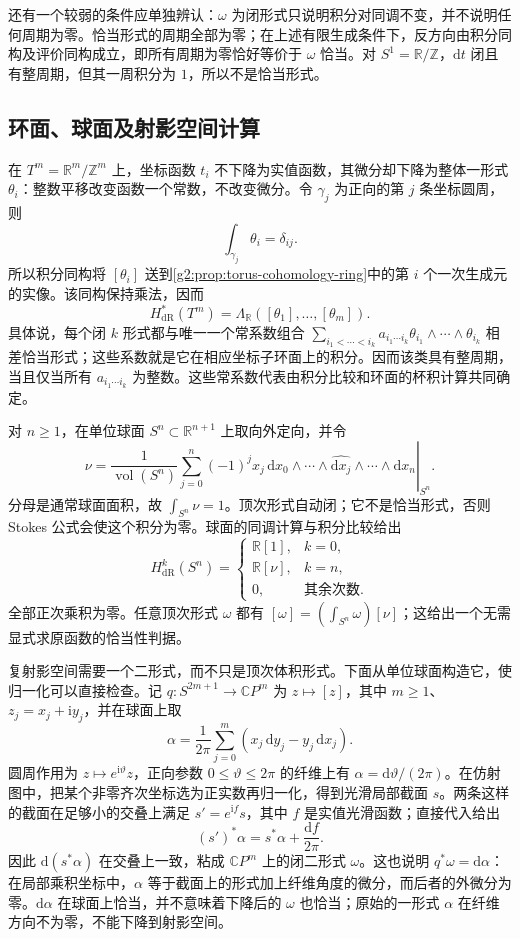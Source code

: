 还有一个较弱的条件应单独辨认：\(\omega\) 为闭形式只说明积分对同调不变，并不说明任何周期为零。恰当形式的周期全部为零；在上述有限生成条件下，反方向由积分同构及评价同构成立，即所有周期为零恰好等价于 \(\omega\) 恰当。对 \(S^1=\mathbb R/\mathbb Z\)，\(\mathrm dt\) 闭且有整周期，但其一周积分为 \(1\)，所以不是恰当形式。

\subsection{环面、球面及射影空间计算}
\label{g2:subsec:0704:02}
在 \(T^m=\mathbb R^m/\mathbb Z^m\) 上，坐标函数 \(t_i\) 不下降为实值函数，其微分却下降为整体一形式 \(\theta_i\)：整数平移改变函数一个常数，不改变微分。令 \(\gamma_j\) 为正向的第 \(j\) 条坐标圆周，则
\[
	\int_{\gamma_j}\theta_i=\delta_{ij}.
\]
所以积分同构将 \([\theta_i]\) 送到\cref{g2:prop:torus-cohomology-ring}中的第 \(i\) 个一次生成元的实像。该同构保持乘法，因而
\begin{equation}\label{g2:eq:torus-de-rham-ring}
	H^*_{\mathrm{dR}}(T^m)
	=\Lambda_{\mathbb R}([\theta_1],\ldots,[\theta_m]).
\end{equation}
具体说，每个闭 \(k\) 形式都与唯一一个常系数组合 \(\sum_{i_1<\cdots<i_k}a_{i_1\cdots i_k}\theta_{i_1}\wedge\cdots\wedge\theta_{i_k}\) 相差恰当形式；这些系数就是它在相应坐标子环面上的积分。因而该类具有整周期，当且仅当所有 \(a_{i_1\cdots i_k}\) 为整数。这些常系数代表由积分比较和环面的杯积计算共同确定。

对 \(n\geq1\)，在单位球面 \(S^n\subset\mathbb R^{n+1}\) 上取向外定向，并令
\[
	\nu=\frac{1}{\operatorname{vol}(S^n)}
	\left.\sum_{j=0}^n(-1)^j x_j\,\mathrm dx_0\wedge\cdots\wedge\widehat{\mathrm dx_j}\wedge\cdots\wedge\mathrm dx_n\right|_{S^n}.
\]
分母是通常球面面积，故 \(\int_{S^n}\nu=1\)。顶次形式自动闭；它不是恰当形式，否则 Stokes 公式会使这个积分为零。球面的同调计算与积分比较给出
\[
	H^k_{\mathrm{dR}}(S^n)=
	\begin{cases}
		\mathbb R[1],&k=0,\\
		\mathbb R[\nu],&k=n,\\
		0,&\text{其余次数}.
	\end{cases}
\]
全部正次乘积为零。任意顶次形式 \(\omega\) 都有 \([\omega]=(\int_{S^n}\omega)[\nu]\)；这给出一个无需显式求原函数的恰当性判据。

复射影空间需要一个二形式，而不只是顶次体积形式。下面从单位球面构造它，使归一化可以直接检查。记 \(q:S^{2m+1}\to\mathbb CP^m\) 为 \(z\mapsto[z]\)，其中 \(m\geq1\)、\(z_j=x_j+\mathrm i y_j\)，并在球面上取
\[
	\alpha=\frac{1}{2\pi}\sum_{j=0}^m(x_j\,\mathrm dy_j-y_j\,\mathrm dx_j).
\]
圆周作用为 \(z\mapsto e^{\mathrm i\vartheta}z\)，正向参数 \(0\leq\vartheta\leq2\pi\) 的纤维上有 \(\alpha=\mathrm d\vartheta/(2\pi)\)。在仿射图中，把某个非零齐次坐标选为正实数再归一化，得到光滑局部截面 \(s\)。两条这样的截面在足够小的交叠上满足 \(s'=e^{\mathrm i f}s\)，其中 \(f\) 是实值光滑函数；直接代入给出
\[
	(s')^*\alpha=s^*\alpha+\frac{\mathrm df}{2\pi}.
\]
因此 \(\mathrm d(s^*\alpha)\) 在交叠上一致，粘成 \(\mathbb CP^m\) 上的闭二形式 \(\omega\)。这也说明 \(q^*\omega=\mathrm d\alpha\)：在局部乘积坐标中，\(\alpha\) 等于截面上的形式加上纤维角度的微分，而后者的外微分为零。\(\mathrm d\alpha\) 在球面上恰当，并不意味着下降后的 \(\omega\) 也恰当；原始的一形式 \(\alpha\) 在纤维方向不为零，不能下降到射影空间。

